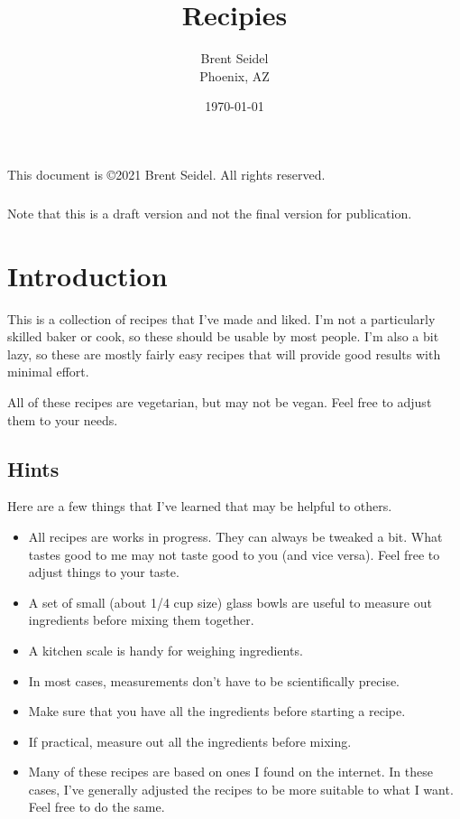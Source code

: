 \documentclass[10pt, openany]{book}
\title{Recipies}
\author{Brent Seidel \\ Phoenix, AZ}
\date{ \today }
\begin{document}
%
%
\frontmatter
\maketitle
\begin{center}
This document is \copyright 2021 Brent Seidel.  All rights reserved.

\paragraph{}Note that this is a draft version and not the final version for publication.
\end{center}
\tableofcontents

\mainmatter

\chapter{Introduction}
This is a collection of recipes that I've made and liked.  I'm not a particularly skilled baker or cook, so these should be usable by most people.  I'm also a bit lazy, so these are mostly fairly easy recipes that will provide good results with minimal effort.

All of these recipes are vegetarian, but may not be vegan.  Feel free to adjust them to your needs.

\section{Hints}
Here are a few things that I've learned that may be helpful to others.
\begin{itemize}
  \item All recipes are works in progress.  They can always be tweaked a bit.  What tastes good to me may not taste good to you (and vice versa).  Feel free to adjust things to your taste.
  \item A set of small (about 1/4 cup size) glass bowls are useful to measure out ingredients before mixing them together.
  \item A kitchen scale is handy for weighing ingredients.
  \item In most cases, measurements don't have to be scientifically precise.
  \item Make sure that you have all the ingredients before starting a recipe.
  \item If practical, measure out all the ingredients before mixing.
  \item Many of these recipes are based on ones I found on the internet.  In these cases, I've generally adjusted the recipes to be more suitable to what I want.  Feel free to do the same.
\end{itemize}
\end{document}
